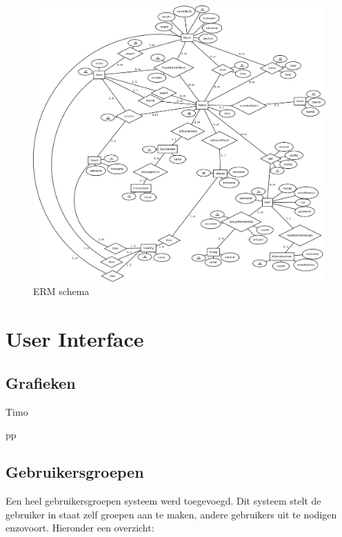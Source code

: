 \documentclass[11pt]{article}
\begin{document}
\begin{figure}[h!]
	\begin{center}
	\includegraphics[scale=0.11]{ERM2.png}

	\caption{ERM schema}
	\label{fig:speler}
	\end{center}
\end{figure}
\section{User Interface}


\subsection{Grafieken}

Timo




pp



\subsection{Gebruikersgroepen}

Een heel gebruikersgroepen systeem werd toegevoegd.  Dit systeem stelt de gebruiker in staat zelf groepen aan te maken, andere gebruikers uit te nodigen enzovoort.  Hieronder een overzicht:\\
\end{document}
